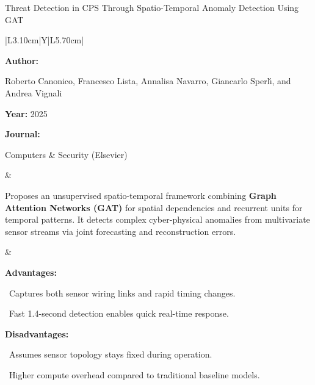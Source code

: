 \begin{frame}[t]{Threat Detection in CPS Through Spatio-Temporal Anomaly Detection Using GAT}
\vspace{-0.30em}
{\footnotesize\setlength{\tabcolsep}{3.5pt}\renewcommand{\arraystretch}{1.10}
\begin{tabularx}{\textwidth}{|L{3.10cm}|Y|L{5.70cm}|}
\hline\lrhdr\hline
\begin{minipage}[t]{\linewidth}\fontsize{7.2pt}{9.2pt}\raggedright\selectfont
\textbf{Author:}\par
Roberto Canonico, Francesco Lista, Annalisa Navarro, Giancarlo Sperl{\'\i}, and Andrea Vignali\par\vspace{4pt}
\textbf{Year:} 2025\par\vspace{4pt}
\textbf{Journal:}\par
Computers \& Security (Elsevier)\par\vspace{4pt}
\end{minipage}
&
\begin{minipage}[t]{\linewidth}\fontsize{7.2pt}{9.2pt}\raggedright\selectfont
Proposes an unsupervised spatio-temporal framework combining \textbf{Graph Attention Networks (GAT)} for spatial dependencies and recurrent units for temporal patterns. It detects complex cyber-physical anomalies from multivariate sensor streams via joint forecasting and reconstruction errors.\par\vspace{4pt}
\end{minipage}
&
\begin{minipage}[t]{\linewidth}\fontsize{7.2pt}{9.0pt}\raggedright\selectfont
\textcolor{strengthGreen}{\textbf{Advantages:}}\par\vspace{1.5pt}
\textbullet~Captures both sensor wiring links and rapid timing changes.\par\vspace{2.0pt}\textbullet~Fast 1.4-second detection enables quick real-time response.\par\vspace{4.0pt}
\textcolor{limitRed}{\textbf{Disadvantages:}}\par\vspace{1.5pt}
\textbullet~Assumes sensor topology stays fixed during operation.\par\vspace{2.0pt}\textbullet~Higher compute overhead compared to traditional baseline models.\par\vspace{4pt}
\end{minipage} \\\hline
\end{tabularx}}
\end{frame}

